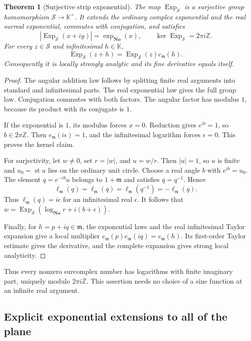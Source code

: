 \documentclass[11pt,letterpaper]{article}
\numberwithin{equation}{section}
\newtheorem{theorem}{Theorem}[section]
\theoremstyle{definition}
\theoremstyle{remark}
\newcommand{\No}{\mathbf{No}}
\newcommand{\K}{\mathbb{K}}
\newcommand{\Z}{\mathbb{Z}}
\newcommand{\mm}{\mathfrak{m}}
\newcommand{\st}{\operatorname{st}}
\newcommand{\Exp}{\operatorname{Exp}}
\begin{document}
\begin{theorem}[Surjective strip exponential]\label{thm:stripexp}
The map $\Exp_{\mathcal S}$ is a surjective group homomorphism
$\mathcal S\to\K^\times$. It extends the ordinary complex exponential and
the real surreal exponential, commutes with conjugation, and satisfies
\begin{equation}\label{eq:stripexp-properties}
 |\Exp_{\mathcal S}(x+iy)|=\exp_{\No}(x),\qquad
 \ker\Exp_{\mathcal S}=2\pi i\Z.
\end{equation}
For every $z\in\mathcal S$ and infinitesimal $h\in\K$,
\[
 \Exp_{\mathcal S}(z+h)=\Exp_{\mathcal S}(z)e_{\mm}(h).
\]
Consequently it is locally strongly analytic and its fine derivative equals
itself.
\end{theorem}
\begin{proof}
The angular addition law follows by splitting finite real arguments into
standard and infinitesimal parts. The real exponential law gives the full
group law. Conjugation commutes with both factors. The angular factor has
modulus $1$, because its product with its conjugate is $1$.

If the exponential is $1$, its modulus forces $x=0$. Reduction gives
$e^{ib}=1$, so $b\in2\pi\Z$. Then $e_{\mm}(i\epsilon)=1$, and the
infinitesimal logarithm forces $\epsilon=0$. This proves the kernel claim.

For surjectivity, let $w\ne0$, set $r=|w|$, and $u=w/r$. Then $|u|=1$,
so $u$ is finite and $u_0=\st u$ lies on the ordinary unit circle. Choose a
real angle $b$ with $e^{ib}=u_0$. The element $q=e^{-ib}u$ belongs to
$1+\mm$ and satisfies $\overline q=q^{-1}$. Hence
\[
 \overline{\ell_{\mm}(q)}
 =\ell_{\mm}(\overline q)=\ell_{\mm}(q^{-1})=-\ell_{\mm}(q).
\]
Thus $\ell_{\mm}(q)=i\epsilon$ for an infinitesimal real $\epsilon$.
It follows that
$w=\Exp_{\mathcal S}(\log_{\No}r+i(b+\epsilon))$.

Finally, for $h=p+iq\in\mm$, the exponential laws and the real
infinitesimal Taylor expansion give a local multiplier
$e_{\mm}(p)e_{\mm}(iq)=e_{\mm}(h)$. Its first-order Taylor estimate gives
the derivative, and the complete expansion gives strong local analyticity.
\end{proof}

Thus every nonzero surcomplex number has logarithms with finite imaginary
part, uniquely modulo $2\pi i\Z$. This assertion needs no choice of a sine
function at an infinite real argument.

\subsection{Explicit exponential extensions to all of the plane}
\end{document}
